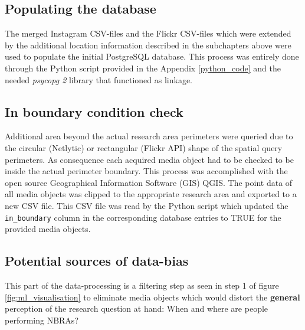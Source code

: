 \subsection{Populating the database} \label{populate_db}
The merged Instagram CSV-files and the Flickr CSV-files which were extended by the additional location information described in the subchapters above were used to populate the initial PostgreSQL database. This process was entirely done through the Python script provided in the Appendix \ref{python_code} and the needed \textit{psycopg 2} library that functioned as linkage.

\subsection{In boundary condition check} \label{in_boundary}
Additional area beyond the actual research area perimeters were queried due to the circular (Netlytic) or rectangular (Flickr API) shape of the spatial query perimeters. As consequence each acquired media object had to be checked to be inside the actual perimeter boundary. This process was accomplished with the open source Geographical Information Software (GIS) QGIS. The point data of all media objects was clipped to the appropriate research area and exported to a new CSV file. This CSV file was read by the Python script which updated the \texttt{in\_boundary} column in the corresponding database entries to TRUE for the provided media objects.

\subsection{Potential sources of data-bias} \label{sources_data_bias}
This part of the data-processing is a filtering step as seen in step 1 of figure \ref{fig:ml_visualisation} to eliminate media objects which would distort the \textbf{general} perception of the research question at hand: When and where are people performing NBRAs?

